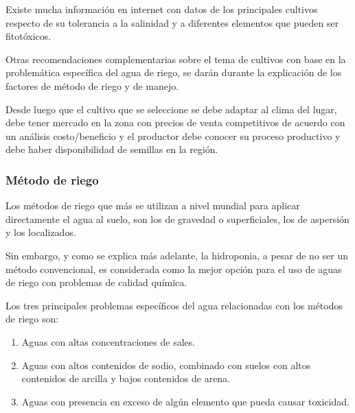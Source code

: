 Existe mucha información en internet con datos de los principales cultivos respecto de su tolerancia a la salinidad y a diferentes elementos que pueden ser fitotóxicos.

Otras recomendaciones complementarias sobre el tema de cultivos con base en la problemática específica del agua de riego, se darán durante la explicación de los factores de método de riego y de manejo.

Desde luego que el cultivo que se seleccione se debe adaptar al clima del lugar, debe tener mercado en la zona con precios de venta competitivos de acuerdo con un análisis costo/beneficio y el productor debe conocer su proceso productivo y debe haber disponibilidad de semillas en la región.

\subsubsection{Método de riego} 

Los métodos de riego que más se utilizan a nivel mundial para aplicar directamente el agua al suelo, son los de gravedad o superficiales, los de aspersión y los localizados.

Sin embargo, y como se explica más adelante, la hidroponia, a pesar de no ser un método convencional, es considerada como la mejor opción para el uso de aguas de riego con problemas de calidad química.

Los tres principales problemas específicos del agua relacionadas con los métodos de riego son:
\begin{enumerate}
    \item Aguas con altas concentraciones de sales.
    \item Aguas con altos contenidos de sodio, combinado con suelos con altos contenidos de arcilla y bajos contenidos de arena.
    \item Aguas con presencia en exceso de algún elemento que pueda causar toxicidad.
\end{enumerate}

